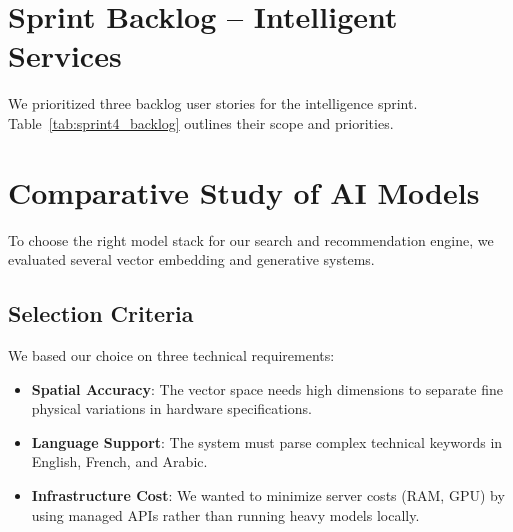 \documentclass[12pt,a4paper]{report}
\begin{document}
\section{Sprint Backlog -- Intelligent Services}

We prioritized three backlog user stories for the intelligence sprint. Table~\ref{tab:sprint4_backlog} outlines their scope and priorities.

\renewcommand{\arraystretch}{1.3}
\setlength{\tabcolsep}{8pt}

\begin{table}[H]
\centering
\caption{User stories for Release 4 (Intelligent Services)}
\label{tab:sprint4_backlog}
\end{table}

\section{Comparative Study of AI Models}

To choose the right model stack for our search and recommendation engine, we evaluated several vector embedding and generative systems.

\subsection{Selection Criteria}

We based our choice on three technical requirements:
\begin{itemize}
    \item \textbf{Spatial Accuracy}: The vector space needs high dimensions to separate fine physical variations in hardware specifications.
    \item \textbf{Language Support}: The system must parse complex technical keywords in English, French, and Arabic.
    \item \textbf{Infrastructure Cost}: We wanted to minimize server costs (RAM, GPU) by using managed APIs rather than running heavy models locally.
\end{itemize}
\end{document}
